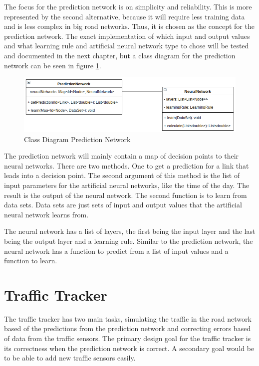 The focus for the prediction network is on simplicity and reliability. This is more represented by the second alternative, because it will require less training data and is less complex in big road networks. Thus, it is chosen as the concept for the prediction network. The exact implementation of which input and output values and what learning rule and artificial neural network type to chose will be tested and documented in the next chapter, but a class diagram for the prediction network can be seen in figure \ref{predictionNetwork}.

\begin{figure}[!ht]
  \centering
  \includegraphics[width=16cm]{figures/predictionNetwork}
  \caption[Class Diagram Prediction Network]{Class Diagram Prediction Network \protect\footnotemark}
  \label{predictionNetwork}
\end{figure}


The prediction network will mainly contain a map of decision points to their neural networks. There are two methods. One to get a prediction for a link that leads into a decision point. The second argument of this method is the list of input parameters for the artificial neural networks, like the time of the day. The result is the output of the neural network. The second function is to learn from data sets. Data sets are just sets of input and output values that the artificial neural network learns from.

The neural network has a list of layers, the first being the input layer and the last being the output layer and a learning rule. Similar to the prediction network, the neural network has a function to predict from a list of input values and a function to learn.

\section{Traffic Tracker}
\label{trafficTracker}

The traffic tracker has two main tasks, simulating the traffic in the road network based of the predictions from the prediction network and correcting errors based of data from the traffic sensors. The primary design goal for the traffic tracker is its correctness when the prediction network is correct. A secondary goal would be to be able to add new traffic sensors easily.


